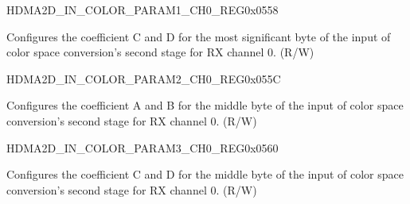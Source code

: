 \begin{register}{H}{DMA2D\_IN\_COLOR\_PARAM1\_CH0\_REG}{0x0558}\label{regdesc:DMA2DINCOLORPARAM1CH0REG}
%
%
\regnewline%
\begin{regdesc}\begin{reglist}
\label{fielddesc:DMA2DINCOLORPARAMH1CH0}\item [DMA2D\_IN\_COLOR\_PARAM\_H1\_CH0] Configures the coefficient C and D for the most significant byte of the input of color space conversion's second stage for RX channel 0. (R/W)
\end{reglist}\end{regdesc}
\end{register}


\begin{register}{H}{DMA2D\_IN\_COLOR\_PARAM2\_CH0\_REG}{0x055C}\label{regdesc:DMA2DINCOLORPARAM2CH0REG}
%
%
\regnewline%
\begin{regdesc}\begin{reglist}
\label{fielddesc:DMA2DINCOLORPARAMM0CH0}\item [DMA2D\_IN\_COLOR\_PARAM\_M0\_CH0] Configures the coefficient A and B for the middle byte of the input of color space conversion's second stage for RX channel 0. (R/W)
\end{reglist}\end{regdesc}
\end{register}


\begin{register}{H}{DMA2D\_IN\_COLOR\_PARAM3\_CH0\_REG}{0x0560}\label{regdesc:DMA2DINCOLORPARAM3CH0REG}
%
%
\regnewline%
\begin{regdesc}\begin{reglist}
\label{fielddesc:DMA2DINCOLORPARAMM1CH0}\item [DMA2D\_IN\_COLOR\_PARAM\_M1\_CH0] Configures the coefficient C and D for the middle byte of the input of color space conversion's second stage for RX channel 0. (R/W)
\end{reglist}\end{regdesc}
\end{register}


